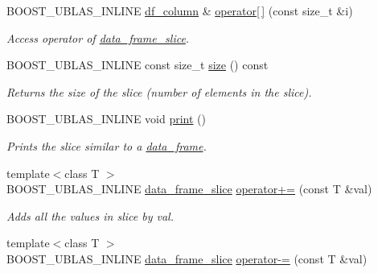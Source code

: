 \begin{DoxyCompactItemize}
B\+O\+O\+S\+T\+\_\+\+U\+B\+L\+A\+S\+\_\+\+I\+N\+L\+I\+NE \hyperlink{classboost_1_1numeric_1_1ublas_1_1df__column}{df\+\_\+column} \& \hyperlink{classboost_1_1numeric_1_1ublas_1_1data__frame__slice_a9df845f93d29e0707e39eb94ccc27b57}{operator\mbox{[}$\,$\mbox{]}} (const size\+\_\+t \&i)
\begin{DoxyCompactList}\small\item\em Access operator of \hyperlink{classboost_1_1numeric_1_1ublas_1_1data__frame__slice}{data\+\_\+frame\+\_\+slice}. \end{DoxyCompactList}\item 
B\+O\+O\+S\+T\+\_\+\+U\+B\+L\+A\+S\+\_\+\+I\+N\+L\+I\+NE const size\+\_\+t \hyperlink{classboost_1_1numeric_1_1ublas_1_1data__frame__slice_a612cba6777919402295333e77e668df0}{size} () const 
\begin{DoxyCompactList}\small\item\em Returns the size of the slice (number of elements in the slice). \end{DoxyCompactList}\item 
B\+O\+O\+S\+T\+\_\+\+U\+B\+L\+A\+S\+\_\+\+I\+N\+L\+I\+NE void \hyperlink{classboost_1_1numeric_1_1ublas_1_1data__frame__slice_a06d355a54c494ff46144381b301886bd}{print} ()
\begin{DoxyCompactList}\small\item\em Prints the slice similar to a \hyperlink{classboost_1_1numeric_1_1ublas_1_1data__frame}{data\+\_\+frame}. \end{DoxyCompactList}\item 
{\footnotesize template$<$class T $>$ }\\B\+O\+O\+S\+T\+\_\+\+U\+B\+L\+A\+S\+\_\+\+I\+N\+L\+I\+NE \hyperlink{classboost_1_1numeric_1_1ublas_1_1data__frame__slice}{data\+\_\+frame\+\_\+slice} \hyperlink{classboost_1_1numeric_1_1ublas_1_1data__frame__slice_af525173771a96c6d2e9349ab2933a211}{operator+=} (const T \&val)
\begin{DoxyCompactList}\small\item\em Adds all the values in slice by {\ttfamily val}. \end{DoxyCompactList}\item 
{\footnotesize template$<$class T $>$ }\\B\+O\+O\+S\+T\+\_\+\+U\+B\+L\+A\+S\+\_\+\+I\+N\+L\+I\+NE \hyperlink{classboost_1_1numeric_1_1ublas_1_1data__frame__slice}{data\+\_\+frame\+\_\+slice} \hyperlink{classboost_1_1numeric_1_1ublas_1_1data__frame__slice_ac61cd0ea96f5a946fb6af6be9fd036ee}{operator-\/=} (const T \&val)

\end{DoxyCompactItemize}
